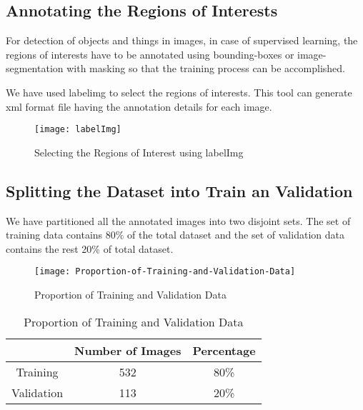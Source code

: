         \clearpage
        \subsection{Annotating the Regions of Interests}
            For detection of objects and things in images, in case of supervised learning, the regions of interests have to be annotated using bounding-boxes or image-segmentation with masking so that the training process can be accomplished.
            
            We have used \gls{labelimg} to select the regions of interests. This tool can generate \acrfull{xml} format file having the annotation details for each image.
        
            \begin{figure}[h]
                \centering
                \texttt{[image: labelImg]}
                \caption{Selecting the Regions of Interest using labelImg}
                \label{fig:labelImg}
            \end{figure}
            
        \subsection{Splitting the Dataset into Train an Validation}
            We have partitioned all the annotated images into two disjoint sets. The set of training data contains 80\% of the total dataset and the set of validation data contains the rest 20\% of total dataset.
            
            \begin{figure}
                \centering
                \texttt{[image: Proportion-of-Training-and-Validation-Data]}
                \caption{Proportion of Training and Validation Data}
                \label{fig:train_test_proportion}
            \end{figure}
        
            \begin{table}
                \centering
                \begin{tabular}{|c|c|c|} \hline
                     &  Number of Images & Percentage \\\hline\hline
                    Training & 532 & 80\% \\\hline
                    Validation & 113 & 20\% \\\hline
                \end{tabular}
                \caption{Proportion of Training and Validation Data}
                \label{tab:train_test_proportion}
            \end{table}
            
